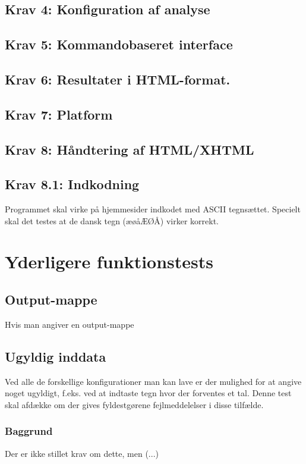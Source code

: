 \documentclass[a4paper,oneside,article, titlepage]{memoir}
\begin{document}
\section*{Krav 4: Konfiguration af analyse}

\section*{Krav 5: Kommandobaseret interface}

\section*{Krav 6: Resultater i HTML-format.}

\section*{Krav 7: Platform}

\section*{Krav 8: Håndtering af HTML/XHTML}

\section*{Krav 8.1: Indkodning}

Programmet skal virke på hjemmesider indkodet med ASCII
tegnsættet. Specielt skal det testes at de dansk tegn (æøåÆØÅ) virker
korrekt.

\chapter{Yderligere funktionstests}

\section{Output-mappe}
Hvis man angiver en output-mappe

\section{Ugyldig inddata}
Ved alle de forskellige konfigurationer man kan lave er der mulighed
for at angive noget ugyldigt, f.eks. ved at indtaste tegn hvor der
forventes et tal. Denne test skal afdække om der gives fyldestgørene
fejlmeddelelser i disse tilfælde.

\subsection{Baggrund}
Der er ikke stillet krav om dette, men (...)
\end{document}
